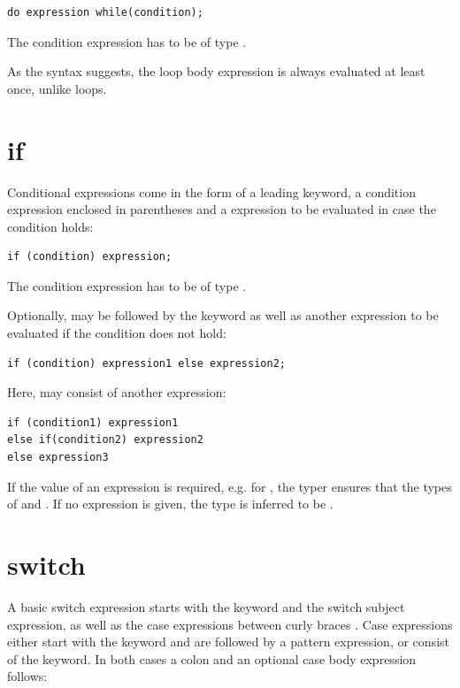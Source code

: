 \documentclass{haxe}
\begin{document}
\begin{lstlisting}
do expression while(condition);
\end{lstlisting}

The condition expression has to be of type .

As the syntax suggests, the loop body expression is always evaluated at least once, unlike  loops.

\section{if}
\label{expression-if}

Conditional expressions come in the form of a leading  keyword, a condition expression enclosed in parentheses \expr{()} and a expression to be evaluated in case the condition holds:

\begin{lstlisting}
if (condition) expression;
\end{lstlisting}

The condition expression has to be of type .

Optionally,  may be followed by the  keyword as well as another expression to be evaluated if the condition does not hold:

\begin{lstlisting}
if (condition) expression1 else expression2;
\end{lstlisting}

Here,  may consist of another  expression:

\begin{lstlisting}
if (condition1) expression1
else if(condition2) expression2
else expression3
\end{lstlisting}

If the value of an  expression is required, e.g. for , the typer ensures that the types of  and  . If no  expression is given, the type is inferred to be .


\section{switch}
\label{expression-switch}

A basic switch expression starts with the  keyword and the switch subject expression, as well as the case expressions between curly braces \expr{\{\}}. Case expressions either start with the  keyword and are followed by a pattern expression, or consist of the  keyword. In both cases a colon \expr{:} and an optional case body expression follows:
\end{document}
